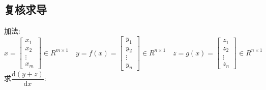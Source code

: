 \documentclass[withoutpreface,bwprint]{cumcmthesis} %
\begin{document}
	\subsection*{复核求导}
		加法:
		\begin{equation}
			x=\left[
				\begin{array}{c}
					x_1\\
					x_2\\
					\vdots\\
					x_m
				\end{array}
			\right] \in R^{m{\times}1} 
			\quad  y=f(x)=\left[
			\begin{array}{c}
				y_1\\
				y_2\\
				\vdots\\
				y_n
			\end{array}
			\right]  \in R^{n{\times}1} 
			\quad   z=g(x)=\left[
			\begin{array}{c}
				z_1\\
				z_2\\
				\vdots\\
				z_n
			\end{array}
			\right] \in R^{n{\times}1}
		\end{equation}
	求$\dfrac{\mathrm{d} (y+z)}{\mathrm{d} x}$:
\end{document}
